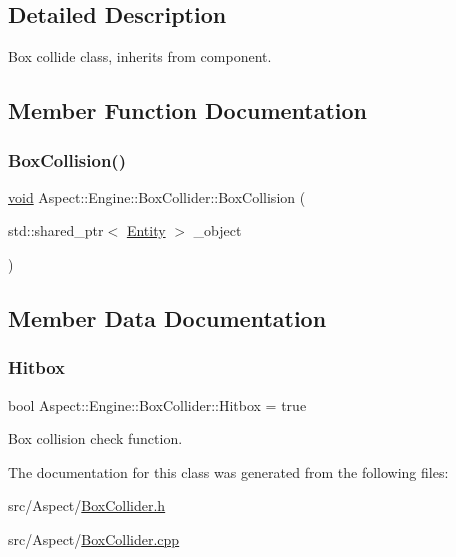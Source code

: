 \subsection{Detailed Description}
Box collide class, inherits from component. 

\subsection{Member Function Documentation}
\mbox{\label{class_aspect_1_1_engine_1_1_box_collider_afc1423c711d7de7123e303942a9809cc}} 
\subsubsection{\texorpdfstring{Box\+Collision()}{BoxCollision()}}
{\footnotesize\ttfamily \mbox{\hyperlink{_s_d_l__opengles2__gl2ext_8h_ae5d8fa23ad07c48bb609509eae494c95}{void}} Aspect\+::\+Engine\+::\+Box\+Collider\+::\+Box\+Collision (\begin{DoxyParamCaption}\item[{std\+::shared\+\_\+ptr$<$ \mbox{\hyperlink{class_aspect_1_1_engine_1_1_entity}{Entity}} $>$}]{\+\_\+object }\end{DoxyParamCaption})}



\subsection{Member Data Documentation}
\mbox{\label{class_aspect_1_1_engine_1_1_box_collider_acd9030e77a23271236fcab865355aa27}} 
\subsubsection{\texorpdfstring{Hitbox}{Hitbox}}
{\footnotesize\ttfamily bool Aspect\+::\+Engine\+::\+Box\+Collider\+::\+Hitbox = true}



Box collision check function. 



The documentation for this class was generated from the following files\+:\begin{DoxyCompactItemize}
\item 
src/\+Aspect/\mbox{\hyperlink{_box_collider_8h}{Box\+Collider.\+h}}\item 
src/\+Aspect/\mbox{\hyperlink{_box_collider_8cpp}{Box\+Collider.\+cpp}}\end{DoxyCompactItemize}
